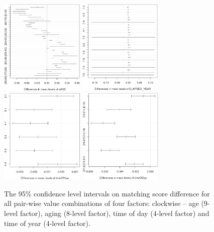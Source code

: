 \documentclass{cta-author}%
\begin{document}
\begin{figure} [!t] \centering
\includegraphics[width=0.5\linewidth,height=1.8in]{eps/PortG-aov-HDNORM=f(AGE,ELAPSE,yd,hh)-1-AGE-c.eps}%
\includegraphics[width=0.5\linewidth,height=1.8in]{eps/PortG-aov-HDNORM=f(AGE,ELAPSE,yd,hh)-2ELAPSE-c.eps}\\
\includegraphics[width=0.5\linewidth,height=1.8in]{eps/PortG-aov-HDNORM=f(AGE,ELAPSE,yd,hh)-3Yd-c}%
\includegraphics[width=0.5\linewidth,height=1.8in]{eps/PortG-aov-HDNORM=f(AGE,ELAPSE,yd,hh)-4-hh-c}

\caption{
The 95\%  confidence level intervals on matching score difference for all pair-wise value combinations of four factors:  clockwise --  age (9-level factor), aging (8-level factor), time of day (4-level factor) and time of year (4-level factor). %
}

\label{fAOVplots}

\end{figure}
\end{document}
